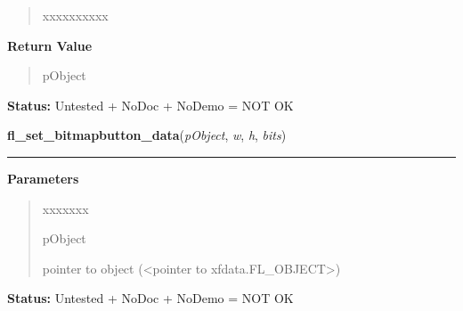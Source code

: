 \begin{boxedminipage}{\funcwidth}
\begin{quote}
\begin{Ventry}{xxxxxxxxxx}
        \end{Ventry}

      \end{quote}

      \textbf{Return Value}
    \vspace{-1ex}

      \begin{quote}
      pObject

      \end{quote}

\textbf{Status:} Untested + NoDoc + NoDemo = NOT OK



    \end{boxedminipage}

    \label{xformslib:library:fl_set_bitmapbutton_data}

    \vspace{0.5ex}

\hspace{.8\funcindent}\begin{boxedminipage}{\funcwidth}

    \raggedright \textbf{fl\_set\_bitmapbutton\_data}(\textit{pObject}, \textit{w}, \textit{h}, \textit{bits})

    \vspace{-1.5ex}

    \rule{\textwidth}{0.5\fboxrule}
\setlength{\parskip}{2ex}
\setlength{\parskip}{1ex}
      \textbf{Parameters}
      \vspace{-1ex}

      \begin{quote}
        \begin{Ventry}{xxxxxxx}

          \item[pObject]

          pointer to object ({\textless}pointer to 
          xfdata.FL\_OBJECT{\textgreater})

        \end{Ventry}

      \end{quote}

\textbf{Status:} Untested + NoDoc + NoDemo = NOT OK



    \end{boxedminipage}

